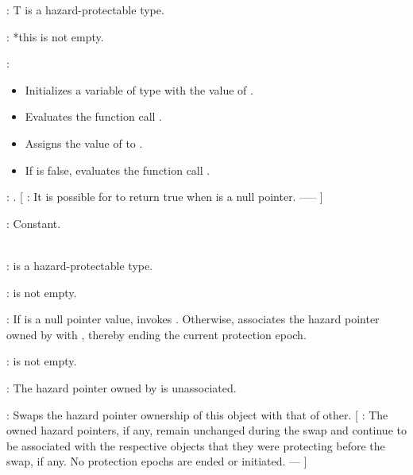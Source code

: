
\pnum
{}: T is a hazard-protectable type.

\pnum
{}: *this is not empty.

\pnum
{}:
\begin{itemize}
\item Initializes a variable  of type  with the value of .
\item Evaluates the function call .
\item Assigns the value of  to .
\item If  is false, evaluates the function call .
\end{itemize}

\pnum
{}: . [ : It is possible for  to return true when  is a null pointer. --—  ]

\pnum
{}: Constant.
\\

\\
\hspace*{1.1em}


\pnum
{}:  is a hazard-protectable type.

\pnum
{}:  is not empty.

\pnum
{}: If  is a null pointer value, invokes . Otherwise, associates the hazard pointer owned by  with , thereby ending the current protection epoch.
\\


\pnum
{}:  is not empty.

\pnum
{}: The hazard pointer owned by  is unassociated.
\\


\pnum
{}: Swaps the hazard pointer ownership of this object with that of other. [ : The owned hazard pointers, if any, remain unchanged during the swap and continue to be associated with the respective objects that they were protecting before the swap, if any. No protection epochs are ended or initiated. —  ]

